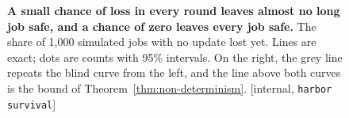 \begin{figure}[H]
\caption{\textbf{A small chance of loss in every round leaves almost no long
job safe, and a chance of zero leaves every job safe.} The share of 1,000
simulated jobs with no update lost yet. Lines are exact; dots are counts with 95\%
intervals. On the right, the grey line repeats the blind curve from the
left, and the line above both curves is the bound of
Theorem~\ref{thm:non-determinism}. [internal, \texttt{harbor survival}]}
\label{fig:prereq-survival}
\end{figure}
